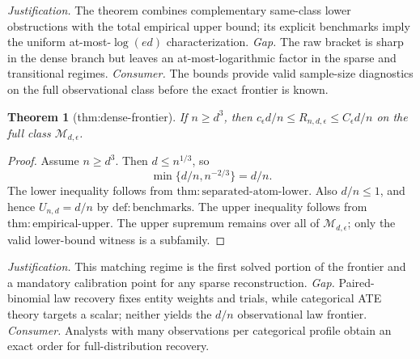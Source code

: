 \documentclass{article}
\newtheorem{theorem}{Theorem}
\begin{document}
\par\smallskip\noindent \textit{Justification.} The theorem combines complementary same-class lower obstructions with the total empirical upper bound; its explicit benchmarks imply the uniform at-most-\(\log(ed)\) characterization. \textit{Gap.} The raw bracket is sharp in the dense branch but leaves an at-most-logarithmic factor in the sparse and transitional regimes. \textit{Consumer.} The bounds provide valid sample-size diagnostics on the full observational class before the exact frontier is known.

\begin{theorem}[thm:dense-frontier]\label{thm:dense-frontier}
If \(n\ge d^3\), then \(c_\epsilon d/n\le R_{n,d,\epsilon}\le C_\epsilon d/n\) on the full class \(\mathcal M_{d,\epsilon}\).
\end{theorem}
\begin{proof}
Assume \(n\geq d^3\).  Then \(d\leq n^{1/3}\), so
\[
\min\{d/n,n^{-2/3}\}=d/n.
\]
The lower inequality follows from \(\mathrm{thm:separated\mbox{-}atom\mbox{-}lower}\).  Also \(d/n\leq1\), and hence \(U_{n,d}=d/n\) by \(\mathrm{def:benchmarks}\).  The upper inequality follows from \(\mathrm{thm:empirical\mbox{-}upper}\).  The upper supremum remains over all of \(\mathcal M_{d,\epsilon}\); only the valid lower-bound witness is a subfamily.
\end{proof}
\par\smallskip\noindent \textit{Justification.} This matching regime is the first solved portion of the frontier and a mandatory calibration point for any sparse reconstruction. \textit{Gap.} Paired-binomial law recovery fixes entity weights and trials, while categorical ATE theory targets a scalar; neither yields the \(d/n\) observational law frontier. \textit{Consumer.} Analysts with many observations per categorical profile obtain an exact order for full-distribution recovery.
\end{document}
